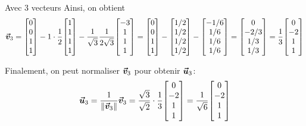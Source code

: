 \documentclass[a4paper]{article}
\begin{document}
\begin{parag}{Avec 3 vecteurs}
    Ainsi, on obtient 
    \[\bvec{v}_3 = \begin{bmatrix} 0 \\ 0 \\ 1 \\ 1 \end{bmatrix} - 1\cdot \frac{1}{2} \begin{bmatrix} 1 \\ 1 \\ 1 \\ 1 \end{bmatrix} - \frac{1}{\sqrt{3}} \frac{1}{2\sqrt{3}} \begin{bmatrix} -3 \\ 1 \\ 1 \\ 1 \end{bmatrix} = \begin{bmatrix} 0 \\ 0 \\ 1 \\ 1 \end{bmatrix} - \begin{bmatrix} 1 / 2 \\ 1 / 2 \\ 1 / 2 \\ 1 / 2 \end{bmatrix}  - \begin{bmatrix} -1 / 6 \\ 1 / 6 \\ 1 / 6 \\ 1 / 6 \end{bmatrix} = \begin{bmatrix} 0 \\ -2 / 3 \\ 1 / 3 \\ 1 / 3 \end{bmatrix} = \frac{1}{3} \begin{bmatrix} 0 \\ -2 \\ 1 \\ 1 \end{bmatrix} \]
    
    Finalement, on peut normaliser $\bm{\protect\vec{v}}_3$ pour obtenir $\bm{\protect\vec{u}}_3$: 
    \[\bvec{u}_3 = \frac{1}{\left\|\bvec{v}_3\right\|} \bvec{v}_3 = \frac{\sqrt{3}}{\sqrt{2}} \cdot \frac{1}{3} \begin{bmatrix} 0 \\ -2 \\ 1 \\ 1 \end{bmatrix} = \frac{1}{\sqrt{6}} \begin{bmatrix} 0 \\ -2 \\ 1 \\ 1 \end{bmatrix} \]


\end{parag}
\end{document}
